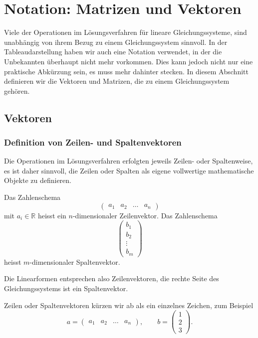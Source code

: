 %
%
%
\section{Notation: Matrizen und Vektoren}
Viele der Operationen im Lösungsverfahren für lineare Gleichungssysteme,
sind unabhängig von ihrem Bezug zu einem Gleichungssystem sinnvoll.
In der Tableaudarstellung haben wir auch eine Notation verwendet,
in der die Unbekannten überhaupt nicht mehr vorkommen.
Dies kann jedoch nicht nur eine praktische Abkürzung sein, es muss mehr
dahinter stecken.
In diesem Abschnitt definieren wir die Vektoren und Matrizen, die zu
einem Gleichungssystem gehören.

\subsection{Vektoren}
\subsubsection{Definition von Zeilen- und Spaltenvektoren}
Die Operationen im Lösungsverfahren erfolgten jeweils Zeilen- oder Spaltenweise,
es ist daher sinnvoll, die Zeilen oder Spalten als eigene vollwertige 
mathematische Objekte zu definieren.

\begin{definition}
Das Zahlenschema
\[
\begin{pmatrix}
a_1&a_2&\dots&a_n
\end{pmatrix}
\]
mit $a_i\in\mathbb R$ heisst ein $n$-dimensionaler Zeilenvektor.
Das Zahlenschema
\[
\begin{pmatrix}
b_1\\b_2\\\vdots\\b_m
\end{pmatrix}
\]
heisst $m$-dimensionaler Spaltenvektor.
\end{definition}
Die Linearformen entsprechen also Zeilenvektoren, die rechte
Seite des Gleichungssystems ist ein Spaltenvektor.

Zeilen oder Spaltenvektoren kürzen wir ab als ein einzelnes
Zeichen, zum Beispiel
\[
a
=
\begin{pmatrix}
a_1&a_2&\dots&a_n
\end{pmatrix},\qquad
b=\begin{pmatrix}
1\\2\\3
\end{pmatrix}.
\]

